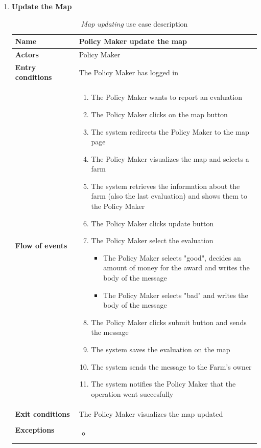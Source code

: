\begin{enumerate}
    \item \textbf{Update the Map}
    \begin{longtable}{p{0.26\linewidth}p{0.75\linewidth}}
        \toprule
        \textbf{Name} & \textbf{Policy Maker update the map} \\
        \midrule
        \textbf{Actors} & Policy Maker \\
        \midrule
        \textbf{Entry conditions} & The Policy Maker has logged in\\
        \midrule
        \textbf{Flow of events} & 
        \begin{enumerate}
            \item The Policy Maker wants to report an evaluation
            \item The Policy Maker clicks on the map button
            \item The system redirects the Policy Maker to the map page
            \item The Policy Maker visualizes the map and selects a farm
            \item The system retrieves the information about the farm (also the last evaluation) and shows them to the Policy Maker
            \item The Policy Maker clicks update button
            \item The Policy Maker select the evaluation
                \begin{itemize}
                    \item The Policy Maker selects "good", decides an amount of money for the award and writes the body of the message
                    \item The Policy Maker selects "bad" and writes the body of the message
                \end{itemize}
            \item The Policy Maker clicks submit button and sends the message
            \item The system saves the evaluation on the map
            \item The system sends the message to the Farm's owner
            \item The system notifies the Policy Maker that the operation went succesfully 
        \end{enumerate} \\
        \midrule
        \textbf{Exit conditions} & The Policy Maker visualizes the map updated\\
        \midrule
        \textbf{Exceptions} & 
        \begin{itemize}
            \item 
        \end{itemize}\\
        \bottomrule
        \caption{\emph{Map updating} use case description}
    \end{longtable}


\end{enumerate}
